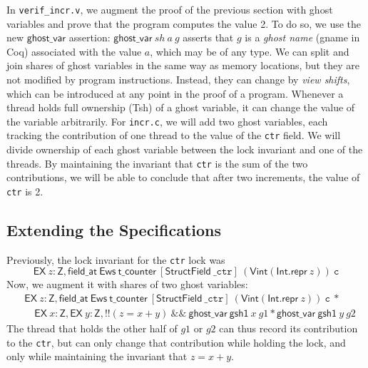 \documentclass[11pt]{article}
\begin{document}
In \texttt{verif\_incr.v}, we augment the proof of the previous section with ghost variables and prove that the program computes the value 2. To do so, we use the new $\mathsf{ghost\_var}$ assertion: $\mathsf{ghost\_var}\ \mathit{sh}\ a\ g$ asserts that $g$ is a \emph{ghost name} (\textsf{gname} in Coq) associated with the value $a$, which may be of any type. We can split and join shares of ghost variables in the same way as memory locations, but they are not modified by program instructions. Instead, they can change by \emph{view shifts}, which can be introduced at any point in the proof of a program. Whenever a thread holds full ownership (\textsf{Tsh}) of a ghost variable, it can change the value of the variable arbitrarily. For \texttt{incr.c}, we will add two ghost variables, each tracking the contribution of one thread to the value of the \texttt{ctr} field. We will divide ownership of each ghost variable between the lock invariant and one of the threads. By maintaining the invariant that \texttt{ctr} is the sum of the two contributions, we will be able to conclude that after two increments, the value of \texttt{ctr} is 2.

\subsection{Extending the Specifications}
Previously, the lock invariant for the \texttt{ctr} lock was $$\mathsf{EX}\ z : \mathsf{Z}, \mathsf{field\_at}\ \mathsf{Ews}\ \mathsf{t\_counter}\ [\mathsf{StructField}\ \texttt{\_ctr}]\ (\mathsf{Vint} (\mathsf{Int.repr}\ z))\ \texttt{c}$$
Now, we augment it with shares of two ghost variables:
\begin{align*}&\mathsf{EX}\ z : \mathsf{Z}, \mathsf{field\_at}\ \mathsf{Ews}\ \mathsf{t\_counter}\ [\mathsf{StructField}\ \texttt{\_ctr}]\ (\mathsf{Vint} (\mathsf{Int.repr}\ z))\ \texttt{c}\ * \\&\quad\mathsf{EX}\ x : \mathsf{Z}, \mathsf{EX}\ y : \mathsf{Z}, !!(z = x + y) \ \&\&\ \mathsf{ghost\_var}\ \mathsf{gsh1}\ x\ g1 * \mathsf{ghost\_var}\ \mathsf{gsh1}\ y\ g2\end{align*}
The thread that holds the other half of $g1$ or $g2$ can thus record its contribution to the \texttt{ctr}, but can only change that contribution while holding the lock, and only while maintaining the invariant that $z = x + y$.
\end{document}
